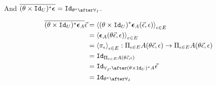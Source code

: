 \documentclass{report}
\newcommand\ev[0]{\vec{\e}}
\newcommand\counit[1]{\boldsymbol{\epsilon}_{#1}}
\begin{document}
And $\bar{(\theta\times\Id{U})\star \counit{}} = \Id{\theta\star\after\allI}$.

\begin{align}
    \bar{(\theta\times\Id{U})\star \counit{A}} \ev  & = \finpr{(\theta\times\Id{U})\star\counit{A}(\ev, \e)}{\e\in E}\\
    & = \finpr{\counit{A}(\theta\ev, \e)}{e\in E}\\
    & = \finpr{\pi_\e}{\e\in E}: \Pi_{\e\in E}A(\theta\ev, \e) \rightarrow \Pi_{\e\in E}A(\theta\ev, \e)\\
    & = \Id{\Pi_{\e\in E}A(\theta\ev, \e)}\\
    & = \Id{\allII\after(\theta\times\Id{U})\star A}\ev\\
    & = \Id{\theta\star\after\allI}
\end{align}
\end{document}
